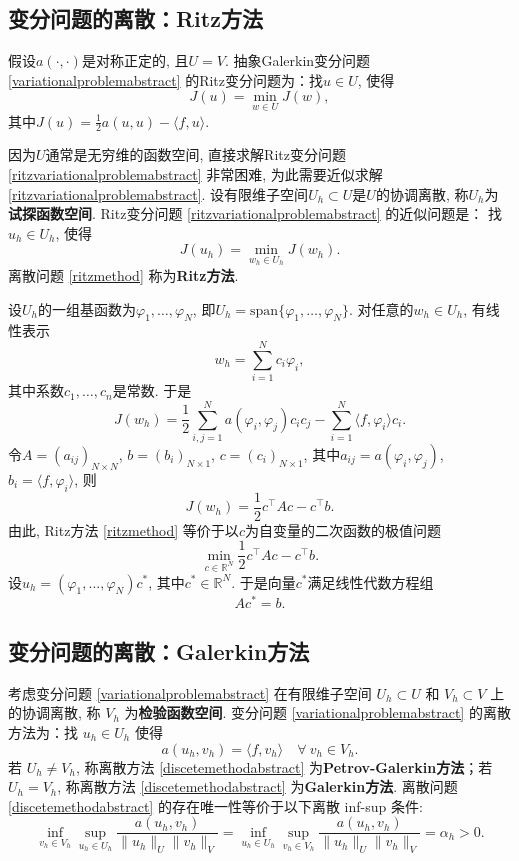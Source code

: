 \subsection{变分问题的离散：Ritz方法}
假设$a(\cdot,\cdot)$是对称正定的, 且$U=V$. 抽象Galerkin变分问题 \eqref{variationalproblemabstract} 的Ritz变分问题为：找$u\in U$, 使得
\begin{equation}\label{ritzvariationalproblemabstract}
J(u)=\min_{w\in U}J(w),
\end{equation}
其中$\displaystyle J(u)=\frac{1}{2}a(u, u)-\langle f, u\rangle$.

因为$U$通常是无穷维的函数空间, 直接求解Ritz变分问题 \eqref{ritzvariationalproblemabstract} 非常困难, 为此需要近似求解 \eqref{ritzvariationalproblemabstract}. 设有限维子空间$U_h\subset U$是$U$的协调离散, 称$U_h$为\textbf{试探函数空间}. Ritz变分问题 \eqref{ritzvariationalproblemabstract} 的近似问题是：
找$u_h\in U_h$, 使得
\begin{equation}\label{ritzmethod}
J(u_h)=\min_{w_h\in U_h}J(w_h).
\end{equation}
离散问题 \eqref{ritzmethod} 称为\textbf{Ritz方法}.

设$U_h$的一组基函数为$\varphi_1,\ldots, \varphi_N$, 即$U_h=\textrm{span}\{\varphi_1,\ldots, \varphi_N\}$. 对任意的$w_h\in U_h$, 有线性表示
$$
w_h=\sum_{i=1}^Nc_i\varphi_i,
$$
其中系数$c_1,\ldots, c_n$是常数. 于是
$$
J(w_h)=\frac{1}{2}\sum_{i,j=1}^Na(\varphi_i, \varphi_j)c_ic_j - \sum_{i=1}^N\langle f, \varphi_i\rangle c_i.
$$
令$A=(a_{ij})_{N\times N}$, $b=(b_i)_{N\times1}$, $c=(c_i)_{N\times1}$, 其中$a_{ij}=a(\varphi_i, \varphi_j)$, $b_i=\langle f, \varphi_i\rangle$, 则
$$
J(w_h)=\frac{1}{2}c^{\intercal}Ac - c^{\intercal}b.
$$
由此, Ritz方法 \eqref{ritzmethod} 等价于以$c$为自变量的二次函数的极值问题
$$
\min_{c\in \mathbb R^N}\frac{1}{2}c^{\intercal}Ac - c^{\intercal}b.
$$
设$u_h=(\varphi_1, \ldots,\varphi_N)c^{*}$, 其中$c^{*}\in\mathbb R^N$. 于是向量$c^{*}$满足线性代数方程组
$$
Ac^{*}=b.
$$

\subsection{变分问题的离散：Galerkin方法}

考虑变分问题 \eqref{variationalproblemabstract} 在有限维子空间 $U_h\subset U$ 和 $V_h\subset V$ 上的协调离散, 称 $V_h$ 为\textbf{检验函数空间}.
变分问题 \eqref{variationalproblemabstract} 的离散方法为：找 $u_h\in U_h$ 使得
\begin{equation}\label{discetemethodabstract}
a(u_h, v_h) = \langle f, v_h\rangle\quad\forall~ v_h\in V_h.
\end{equation}
若 $U_h\neq V_h$, 称离散方法 \eqref{discetemethodabstract} 为\textbf{Petrov-Galerkin方法}；若 $U_h=V_h$, 称离散方法 \eqref{discetemethodabstract} 为\textbf{Galerkin方法}.
离散问题 \eqref{discetemethodabstract} 的存在唯一性等价于以下离散 inf-sup 条件:
\begin{equation}\label{disceteinfsupabstract}
\inf_{v_h\in V_h}\sup_{u_h\in U_h}\frac{a(u_h, v_h)}{\|u_h\|_U\|v_h\|_V}=\inf_{u_h\in U_h}\sup_{v_h\in V_h}\frac{a(u_h, v_h)}{\|u_h\|_U\|v_h\|_V}=\alpha_h>0.
\end{equation}

